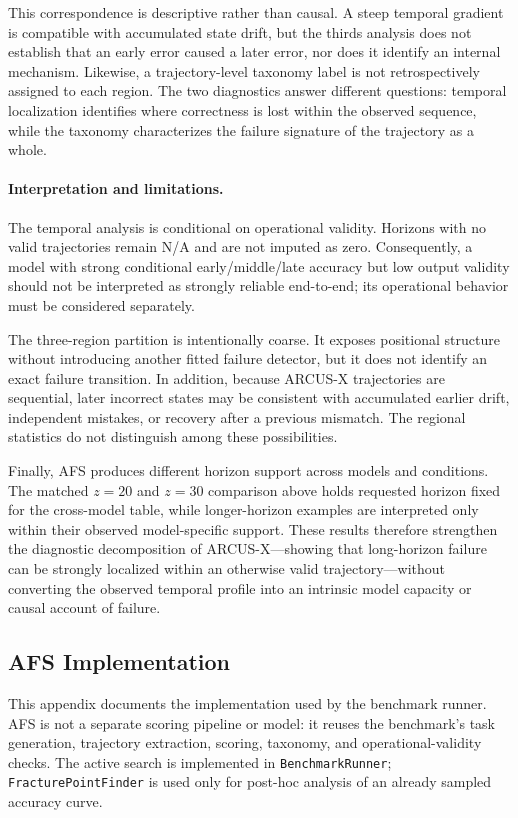 \documentclass{article}
\begin{document}
This correspondence is descriptive rather than causal. A steep temporal
gradient is compatible with accumulated state drift, but the thirds analysis
does not establish that an early error caused a later error, nor does it
identify an internal mechanism. Likewise, a trajectory-level taxonomy label is
not retrospectively assigned to each region. The two diagnostics answer
different questions: temporal localization identifies where correctness is
lost within the observed sequence, while the taxonomy characterizes the
failure signature of the trajectory as a whole.

\paragraph{Interpretation and limitations.}
The temporal analysis is conditional on operational validity. Horizons with no
valid trajectories remain N/A and are not imputed as zero. Consequently, a
model with strong conditional early/middle/late accuracy but low output
validity should not be interpreted as strongly reliable end-to-end; its
operational behavior must be considered separately.

The three-region partition is intentionally coarse. It exposes positional
structure without introducing another fitted failure detector, but it does not
identify an exact failure transition. In addition, because ARCUS-X trajectories
are sequential, later incorrect states may be consistent with accumulated
earlier drift, independent mistakes, or recovery after a previous mismatch.
The regional statistics do not distinguish among these possibilities.

Finally, AFS produces different horizon support across models and conditions.
The matched $z=20$ and $z=30$ comparison above holds requested horizon fixed for the
cross-model table, while longer-horizon examples are interpreted only within
their observed model-specific support. These results therefore strengthen the
diagnostic decomposition of ARCUS-X---showing that long-horizon failure can be
strongly localized within an otherwise valid trajectory---without converting
the observed temporal profile into an intrinsic model capacity or causal
account of failure.

\subsection{AFS Implementation}
\label{app:afs_implementation}
This appendix documents the implementation used by the benchmark runner. AFS is not a separate scoring pipeline or model: it reuses the benchmark's task generation, trajectory extraction, scoring, taxonomy, and operational-validity checks. The active search is implemented in \texttt{BenchmarkRunner}; \texttt{FracturePointFinder} is used only for post-hoc analysis of an already sampled accuracy curve.
\end{document}
